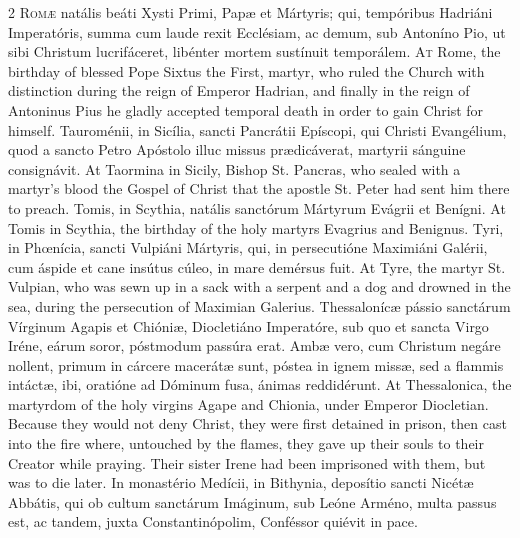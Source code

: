 \begin{paracol}{2}
\lettrine[lines=2]{R}{omæ} natális beáti Xysti Primi, Papæ et 
 Mártyris; qui, tempóribus Hadriáni Imperatóris, summa cum laude rexit 
 Ecclésiam, ac demum, sub Antoníno Pio, ut sibi Christum lucrifáceret, 
 libénter mortem sustínuit temporálem.
\switchcolumn
{}
\lettrine[lines=2]{A}{t} Rome, the birthday of blessed Pope Sixtus the First, martyr, who ruled 
 the Church with distinction during the reign of Emperor Hadrian, and finally 
 in the reign of Antoninus Pius he gladly accepted temporal death in order to 
 gain Christ for himself.
\switchcolumn*
{}
Tauroménii, in Sicília, sancti Pancrátii Epíscopi, qui Christi Evangélium, 
 quod a sancto Petro Apóstolo illuc missus prædicáverat, 
 martyrii sánguine consignávit.
\switchcolumn
{}
At Taormina in Sicily, Bishop St. Pancras, who sealed with a martyr's blood 
 the Gospel of Christ that the apostle St. Peter had sent him there to 
 preach.
\switchcolumn*
{}
Tomis, in Scythia, natális sanctórum Mártyrum Evágrii et Benígni.
\switchcolumn
{}
At Tomis in Scythia, the birthday of the holy martyrs Evagrius and Benignus.
\switchcolumn*
{}
Tyri, in Phœnícia, sancti Vulpiáni Mártyris, 
 qui, in persecutióne Maximiáni Galérii, cum áspide et cane insútus cúleo, in 
 mare demérsus fuit.
\switchcolumn
{}
At Tyre, the martyr St. Vulpian, who was sewn up in a sack with a serpent 
 and a dog and drowned in the sea, during the persecution of Maximian 
 Galerius.
\switchcolumn*
{}
Thessalonícæ 
 pássio sanctárum Vírginum Agapis et Chióniæ, Diocletiáno Imperatóre, sub quo 
 et sancta Virgo Iréne, eárum soror, póstmodum passúra erat. Ambæ vero, 
 cum Christum negáre nollent, primum in cárcere macerátæ sunt, póstea in 
 ignem missæ, sed a flammis intáctæ, ibi, oratióne ad Dóminum fusa, ánimas 
 reddidérunt.
\switchcolumn
{}
At Thessalonica, the martyrdom of the holy virgins Agape and Chionia, under 
 Emperor Diocletian. Because they would not deny Christ, they were 
 first detained in prison, then cast into the fire where, untouched by the 
 flames, they gave up their souls to their Creator while praying. Their 
 sister Irene had been imprisoned with them, but was to die later.
\switchcolumn*
{}
In monastério Medícii, in Bithynia, deposítio sancti Nicétæ 
 Abbátis, qui ob cultum sanctárum Imáginum, sub Leóne Arméno, multa passus 
 est, ac tandem, juxta Constantinópolim, Conféssor quiévit in pace.

\end{paracol}
